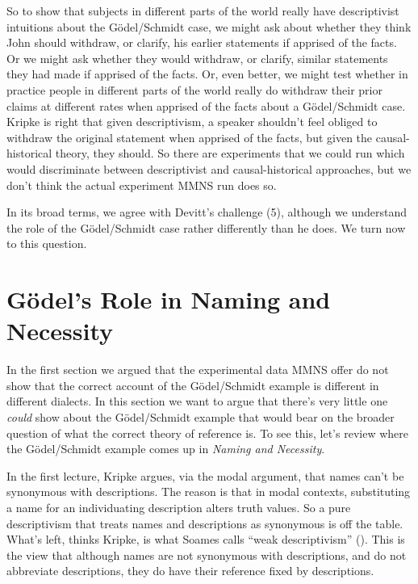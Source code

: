 \documentclass[
  11pt,
  letterpaper,
  DIV=11,
  numbers=noendperiod,
  twoside]{scrartcl}
\begin{document}
So to show that subjects in different parts of the world really have
descriptivist intuitions about the Gödel/Schmidt case, we might ask
about whether they think John should withdraw, or clarify, his earlier
statements if apprised of the facts. Or we might ask whether they would
withdraw, or clarify, similar statements they had made if apprised of
the facts. Or, even better, we might test whether in practice people in
different parts of the world really do withdraw their prior claims at
different rates when apprised of the facts about a Gödel/Schmidt case.
Kripke is right that given descriptivism, a speaker shouldn't feel
obliged to withdraw the original statement when apprised of the facts,
but given the causal-historical theory, they should. So there are
experiments that we could run which would discriminate between
descriptivist and causal-historical approaches, but we don't think the
actual experiment MMNS run does so.

In its broad terms, we agree with Devitt's challenge (5), although we
understand the role of the Gödel/Schmidt case rather differently than he
does. We turn now to this question.

\section{Gödel's Role in Naming and
Necessity}\label{guxf6dels-role-in-naming-and-necessity}

In the first section we argued that the experimental data MMNS offer do
not show that the correct account of the Gödel/Schmidt example is
different in different dialects. In this section we want to argue that
there's very little one \emph{could} show about the Gödel/Schmidt
example that would bear on the broader question of what the correct
theory of reference is. To see this, let's review where the
Gödel/Schmidt example comes up in \emph{Naming and Necessity}.

In the first lecture, Kripke argues, via the modal argument, that names
can't be synonymous with descriptions. The reason is that in modal
contexts, substituting a name for an individuating description alters
truth values. So a pure descriptivism that treats names and descriptions
as synonymous is off the table. What's left, thinks Kripke, is what
Soames calls ``weak descriptivism'' (). This is the view that although names are not
synonymous with descriptions, and do not abbreviate descriptions, they
do have their reference fixed by descriptions.
\end{document}
